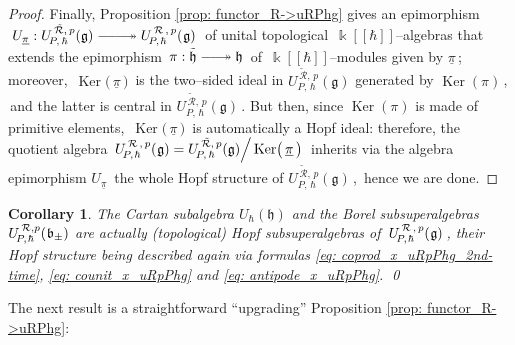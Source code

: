 \documentclass[12pt,reqno,twoside,a4paper]{amsart}
\numberwithin{equation}{section}
\newtheorem{cor}[lema]{Corollary}
\theoremstyle{definition}
\newtheorem{free text}[lema]{}
\theoremstyle{remark}
\newcommand \Ker{\operatorname{Ker}}
\newcommand{\R}{{\mathcal R}}
\def \kh{{\Bbbk[[\hbar]]}}
\def \lieg{\mathfrak{g}}
\def \lieb{\mathfrak{b}}
\def \lieh{\mathfrak{h}}
\def \uRpPhg{U^{\,\R\,,\,p}_{\!P,\hskip0,7pt\hbar}(\hskip0,5pt\lieg)}
\def \uRpPhbpm{U^{\,\R,p}_{\!P,\hskip0,7pt\hbar}(\hskip0,5pt\lieb_\pm)}
\theoremstyle{plain}
\begin{document}
\begin{proof}
                                                                   \par
   Finally,  Proposition \ref{prop: functor_R->uRPhg}  gives an epimorphism  $ \; U_{\underline{\pi}} : U^{\,\tilde{\R},\,p}_{\!P,\,\hbar}(\lieg) \relbar\joinrel\relbar\joinrel\relbar\joinrel\twoheadrightarrow \uRpPhg \; $  of unital topological  $ \, \kh $--algebras  that extends the epimorphism  $ \, \pi : \tilde{\lieh} \relbar\joinrel\relbar\joinrel\twoheadrightarrow \lieh \, $
 of  $ \, \kh $--modules  given by  $ \underline{\pi} \, $;  \,moreover,  $ \, \Ker\!\big(\, \underline{\pi} \,\big) \, $  is the two--sided ideal in  $ U^{\,\tilde{\R},\,p}_{\!P,\,\hbar}(\lieg) $  generated by  $ \Ker(\pi) \, $,  \,and the latter is central in  $ U^{\,\tilde{\R},\,p}_{\!P,\,\hbar}(\lieg) \, $.  But then, since  $ \Ker(\pi) $  is made of primitive elements,  $ \, \Ker\!\big(\, \underline{\pi} \,\big) \, $  is automatically a Hopf ideal: therefore, the quotient algebra  $ \, \uRpPhg = U^{\,\tilde{\R},\,p}_{\!P,\,\hbar}(\lieg) \Big/ \Ker\!\big(\, \underline{\pi} \,\big) \, $  inherits via the algebra epimorphism  $ U_{\underline{\pi}} \, $  the whole Hopf structure of  $ U^{\,\tilde{\R},\,p}_{\!P,\,\hbar}(\lieg) \, $,  \,hence we are done.
%
\end{proof}

\vskip11pt

\begin{cor}  \label{cor: Hopf-struct_Cartan-&-Borel}
%
%
%
 The Cartan subalgebra  $ U_\hbar(\lieh) $  and the Borel subsuperalgebras\break  $ \uRpPhbpm $  are actually (topological)  \textsl{Hopf}  subsuperalgebras of  $ \, \uRpPhg \, $,  their Hopf structure being described again via formulas  \eqref{eq: coprod_x_uRpPhg_2nd-time},  \eqref{eq: counit_x_uRpPhg}  and  \eqref{eq: antipode_x_uRpPhg}.   \hfill  \qed
%
\end{cor}

\vskip7pt

   The next result is a straightforward ``upgrading''  Proposition \ref{prop: functor_R->uRPhg}:

\vskip11pt
\end{document}
